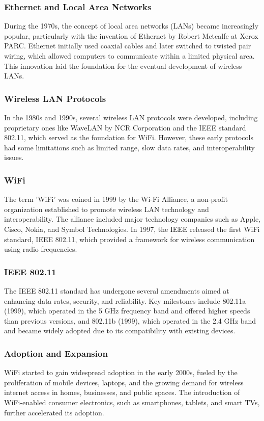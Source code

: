 \subsubsection{Ethernet and Local Area Networks}
During the 1970s, the concept of local area networks (LANs) became increasingly popular, particularly with the invention of Ethernet by Robert Metcalfe at Xerox PARC. Ethernet initially used coaxial cables and later switched to twisted pair wiring, which allowed computers to communicate within a limited physical area. This innovation laid the foundation for the eventual development of wireless LANs.

\subsubsection{Wireless LAN Protocols}
In the 1980s and 1990s, several wireless LAN protocols were developed, including proprietary ones like WaveLAN by NCR Corporation and the IEEE standard 802.11, which served as the foundation for WiFi. However, these early protocols had some limitations such as limited range, slow data rates, and interoperability issues.

\subsubsection{WiFi}
The term 'WiFi' was coined in 1999 by the Wi-Fi Alliance, a non-profit organization established to promote wireless LAN technology and interoperability. The alliance included major technology companies such as Apple, Cisco, Nokia, and Symbol Technologies. In 1997, the IEEE released the first WiFi standard, IEEE 802.11, which provided a framework for wireless communication using radio frequencies.

\subsubsection{IEEE 802.11}
 The IEEE 802.11 standard has undergone several amendments aimed at enhancing data rates, security, and reliability. Key milestones include 802.11a (1999), which operated in the 5 GHz frequency band and offered higher speeds than previous versions, and 802.11b (1999), which operated in the 2.4 GHz band and became widely adopted due to its compatibility with existing devices.

\subsubsection{Adoption and Expansion}
WiFi started to gain widespread adoption in the early 2000s, fueled by the proliferation of mobile devices, laptops, and the growing demand for wireless internet access in homes, businesses, and public spaces. The introduction of WiFi-enabled consumer electronics, such as smartphones, tablets, and smart TVs, further accelerated its adoption.

